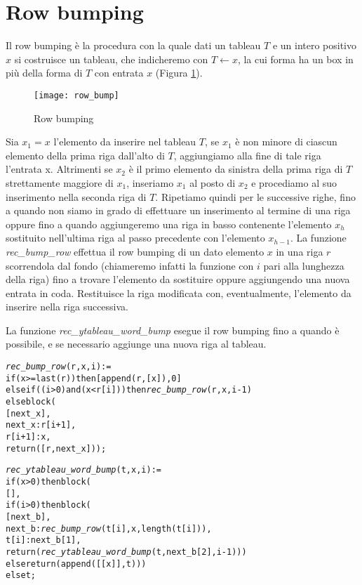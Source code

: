 \section{Row bumping}
Il row bumping \`e la procedura con la quale dati un tableau $T$ e un
intero positivo $x$ si costruisce un tableau, che indicheremo con $T
\gets x$, la cui forma ha un box in pi\`u della forma di $T$ con
entrata $x$ (Figura \ref{fig:rowbump}).

\begin{figure}[h]
\centering
\texttt{[image: row\_bump]}
\caption{Row bumping}
\label{fig:rowbump}
\end{figure}

Sia $x_1 = x$ l'elemento da inserire nel tableau $T$, se $x_1$ \`e non 
minore di ciascun elemento della prima riga
dall'alto di $T$, aggiungiamo alla fine di tale riga l'entrata x.
Altrimenti se $x_2$ \`e il primo elemento da sinistra della prima riga
di $T$ strettamente maggiore di $x_1$, inseriamo $x_1$ al posto di
$x_2$ e procediamo al suo inserimento nella seconda riga di $T$.
Ripetiamo quindi per le successive righe, fino a quando non siamo in
grado di effettuare un inserimento al termine di una riga oppure fino
a quando aggiungeremo una riga in basso contenente l'elemento $x_h$
sostituito nell'ultima riga al passo precedente con l'elemento
$x_{h-1}$.
La funzione \emph{rec\_bump\_row} effettua il row bumping di un dato
elemento $x$ in una riga $r$ scorrendola dal fondo (chiameremo infatti
la funzione con $i$ pari alla lunghezza della riga) fino a trovare
l'elemento da sostituire oppure aggiungendo una nuova entrata in coda.
Restituisce la riga modificata con, eventualmente, l'elemento da
inserire nella riga successiva.

La funzione \emph{rec\_ytableau\_word\_bump} esegue il row bumping
fino a quando \`e possibile, e se necessario aggiunge una nuova riga
al tableau.

\begin{alltt}
\emph{rec\_bump\_row} (r, x, i) :=
if (x >= last (r)) then [append (r, [x]), 0]
else if ((i > 0) and (x < r[i])) then \emph{rec\_bump\_row} (r, x, i-1)
else block (
  [next\_x],
  next\_x : r[i+1],
  r[i+1] : x,
  return ([r, next\_x]));

\emph{rec\_ytableau\_word\_bump} (t, x, i) :=
if (x > 0) then block (
  [],
  if (i > 0) then block (
    [next\_b],
    next\_b : \emph{rec\_bump\_row} (t[i], x, length (t[i])),
    t[i] : next\_b[1],
    return (\emph{rec\_ytableau\_word\_bump} (t, next\_b[2], i-1)))
  else return (append ([[x]], t)))
else t;
\end{alltt}


